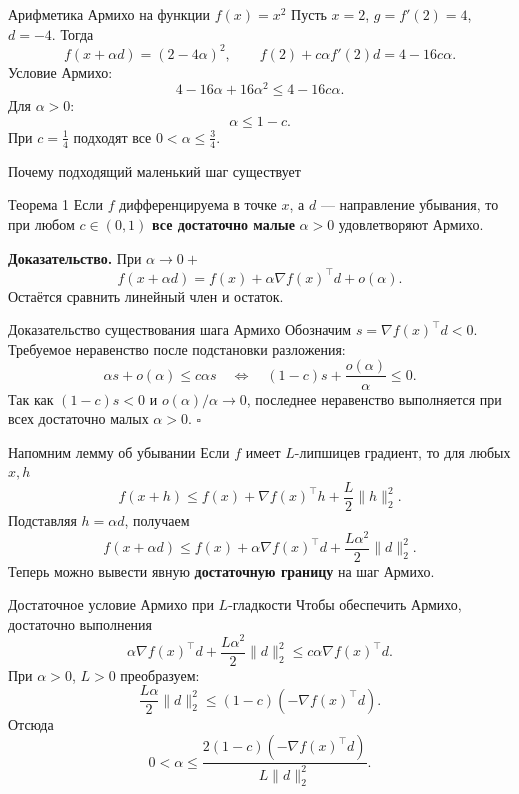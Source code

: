 \documentclass[aspectratio=169,10pt]{beamer}
\begin{document}
\begin{frame}{Арифметика Армихо на функции $f(x)=x^2$}
\small
Пусть $x=2$, $g=f'(2)=4$, $d=-4$. Тогда
\[
f(x+\alpha d)=(2-4\alpha)^2,\qquad
f(2)+c\alpha f'(2)d=4-16c\alpha.
\]
Условие Армихо:
\[
4-16\alpha+16\alpha^2\le4-16c\alpha.
\]
Для $\alpha>0$:
\[
\boxed{\alpha\le1-c.}
\]
При $c=\frac14$ подходят все $0<\alpha\le\frac34$.
\end{frame}

\begin{frame}{Почему подходящий маленький шаг существует}
\small
\begin{block}{Теорема 1}
Если $f$ дифференцируема в точке $x$, а $d$ --- направление убывания, то при любом $c\in(0,1)$ \textbf{все достаточно малые} $\alpha>0$ удовлетворяют Армихо.
\end{block}
\textbf{Доказательство.} При $\alpha\to0+$
\[
f(x+\alpha d)=f(x)+\alpha\nabla f(x)^\top d+o(\alpha).
\]
Остаётся сравнить линейный член и остаток.
\end{frame}

\begin{frame}{Доказательство существования шага Армихо}
\small
Обозначим $s=\nabla f(x)^\top d<0$.
Требуемое неравенство после подстановки разложения:
\[
\alpha s+o(\alpha)\le c\alpha s
\quad\Longleftrightarrow\quad
(1-c)s+\frac{o(\alpha)}{\alpha}\le0.
\]
Так как $(1-c)s<0$ и $o(\alpha)/\alpha\to0$, последнее неравенство выполняется при всех достаточно малых $\alpha>0$. $\square$
\end{frame}

\begin{frame}{Напомним лемму об убывании}
\small
Если $f$ имеет $L$-липшицев градиент, то для любых $x,h$
\[
\boxed{f(x+h)\le f(x)+\nabla f(x)^\top h+\frac L2\|h\|_2^2.}
\]
Подставляя $h=\alpha d$, получаем
\[
f(x+\alpha d)\le f(x)+\alpha\nabla f(x)^\top d
+\frac{L\alpha^2}{2}\|d\|_2^2.
\]
Теперь можно вывести явную \textbf{достаточную границу} на шаг Армихо.
\end{frame}

\begin{frame}{Достаточное условие Армихо при $L$-гладкости}
\small
Чтобы обеспечить Армихо, достаточно выполнения
\[
\alpha\nabla f(x)^\top d+\frac{L\alpha^2}{2}\|d\|_2^2
\le c\alpha\nabla f(x)^\top d.
\]
При $\alpha>0$, $L>0$ преобразуем:
\[
\frac{L\alpha}{2}\|d\|_2^2
\le (1-c)(-\nabla f(x)^\top d).
\]
Отсюда
\[
\boxed{0<\alpha\le \frac{2(1-c)(-\nabla f(x)^\top d)}{L\|d\|_2^2}.}
\]
\end{frame}
\end{document}
